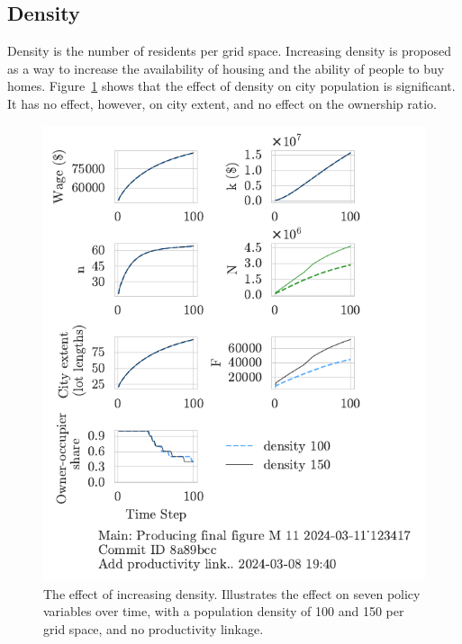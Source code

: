 \newpage


\subsection{Density}
Density is the number of residents per grid space. Increasing density is proposed as a way to increase the availability of housing and the ability of people to buy homes. Figure~\ref{fig:density_ownership_trajectory} shows that the effect of density on city population is significant. It has no effect, however, on city extent, and no effect on the ownership ratio.


\begin{figure}[h!bt]
    \centering
    \includegraphics[scale=1, trim={0 1.4cm 0 0},clip]{fig/density-Main-123417.pdf}
    \caption[The effect of increasing density]{The effect of increasing density. Illustrates the effect on seven policy variables over time, with a population density of 100 and 150 per grid space, and no productivity linkage.}
    \label{fig:density_ownership_trajectory}
\end{figure}

